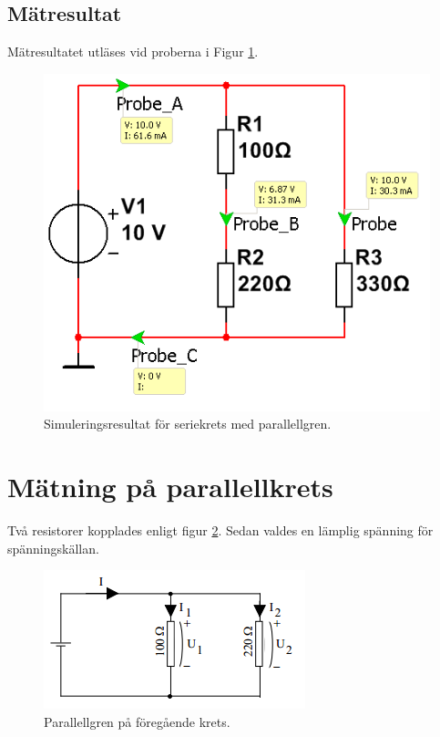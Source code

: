 \documentclass[11pt,a4paper]{article}
\begin{document}
\subsection{Mätresultat}\label{}
Mätresultatet utläses vid proberna i Figur \ref{fig:sim-para}.


\begin{figure}[htbp]
    \centering
    \includegraphics[scale=0.5]{ee466multisim/2.png}
    \caption{Simuleringsresultat för seriekrets med parallellgren.}
    \label{fig:sim-para}
\end{figure}

\clearpage

\section{Mätning på parallellkrets}\label{}
Två resistorer kopplades enligt figur \ref{fig:3-mm-schem}.
Sedan valdes en lämplig spänning för spänningskällan.

\begin{figure}[htbp]
    \centering
        \includegraphics[scale=1]{misc/krets3.png}
    \caption{Parallellgren på föregående krets.}
    \label{fig:3-mm-schem}
\end{figure}
\end{document}
